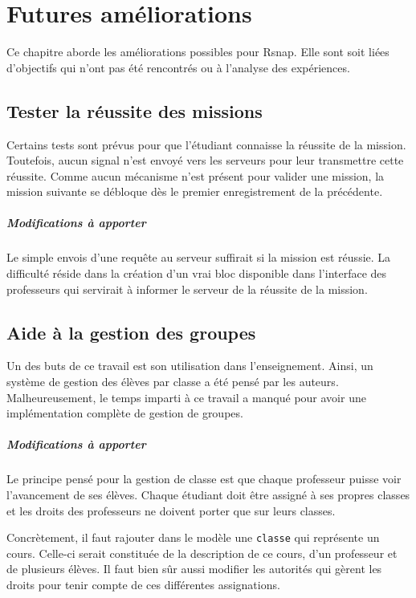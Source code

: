 \chapter{Futures améliorations}
Ce chapitre aborde les améliorations possibles pour \gls{Rsnap}. Elle sont soit liées d'objectifs qui n'ont pas été rencontrés ou à l'analyse des expériences.

\section{Tester la réussite des missions}
Certains tests sont prévus pour que l'étudiant connaisse la réussite de la mission. Toutefois, aucun signal n'est envoyé vers les serveurs pour leur transmettre cette réussite. Comme aucun mécanisme n'est présent pour valider une mission, la mission suivante se débloque dès le premier enregistrement de la précédente.

\paragraph{Modifications à apporter}
Le simple envois d'une requête au serveur suffirait si la mission est réussie. La difficulté réside dans la création d'un vrai bloc disponible dans l'interface des professeurs qui servirait à informer le serveur de la réussite de la mission.

\section{Aide à la gestion des groupes}
Un des buts de ce travail est son utilisation dans l'enseignement. Ainsi, un système de gestion des élèves par classe a été pensé par les auteurs. Malheureusement, le temps imparti à ce travail a manqué pour avoir une implémentation complète de gestion de groupes.

\paragraph{Modifications à apporter}
Le principe pensé pour la gestion de classe est que chaque professeur puisse voir l'avancement de ses élèves. Chaque étudiant doit être assigné à ses propres classes et les droits des professeurs ne doivent porter que sur leurs classes.

Concrètement, il faut rajouter dans le modèle une \texttt{classe} qui représente un cours. Celle-ci serait constituée de la description de ce cours, d'un professeur et de plusieurs élèves. Il faut bien sûr aussi modifier les autorités qui gèrent les droits pour tenir compte de ces différentes assignations.


